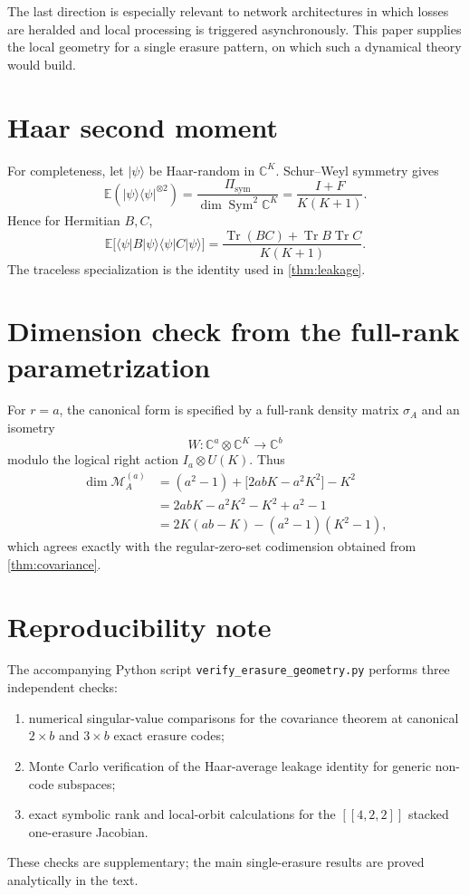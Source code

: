 \documentclass[11pt]{article}
\theoremstyle{definition}
\newcommand{\cM}{\mathcal M}
\newcommand{\Tr}{\operatorname{Tr}}
\newcommand{\C}{\mathbb C}
\newcommand{\1}{\mathbf 1}
\newcommand{\ket}[1]{\lvert #1\rangle}
\newcommand{\bra}[1]{\langle #1\rvert}
\begin{document}
The last direction is especially relevant to network architectures in which losses are heralded and local processing is triggered asynchronously.  This paper supplies the local geometry for a single erasure pattern, on which such a dynamical theory would build.

\appendix

\section{Haar second moment}

For completeness, let $\ket{\psi}$ be Haar-random in $\C^K$.  Schur--Weyl symmetry gives
\[
\mathbb E\left(\ket{\psi}\bra{\psi}^{\otimes2}\right)
=\frac{\Pi_{\mathrm{sym}}}{\dim\operatorname{Sym}^2\C^K}
=\frac{I+F}{K(K+1)}.
\]
Hence for Hermitian $B,C$,
\[
\mathbb E\bigl[\bra{\psi}B\ket{\psi}\bra{\psi}C\ket{\psi}\bigr]
=\frac{\Tr(BC)+\Tr B\Tr C}{K(K+1)}.
\]
The traceless specialization is the identity used in \cref{thm:leakage}.

\section{Dimension check from the full-rank parametrization}

For $r=a$, the canonical form is specified by a full-rank density matrix $\sigma_A$ and an isometry
\[
W:\C^a\otimes\C^K\to\C^b
\]
modulo the logical right action $I_a\otimes U(K)$.  Thus
\begin{align*}
\dim\cM_A^{(a)}
&=(a^2-1)+\bigl[2abK-a^2K^2\bigr]-K^2\\
&=2abK-a^2K^2-K^2+a^2-1\\
&=2K(ab-K)-(a^2-1)(K^2-1),
\end{align*}
which agrees exactly with the regular-zero-set codimension obtained from \cref{thm:covariance}.

\section{Reproducibility note}

The accompanying Python script \texttt{verify\_erasure\_geometry.py} performs three independent checks:
\begin{enumerate}
    \item numerical singular-value comparisons for the covariance theorem at canonical $2\times b$ and $3\times b$ exact erasure codes;
    \item Monte Carlo verification of the Haar-average leakage identity for generic non-code subspaces;
    \item exact symbolic rank and local-orbit calculations for the $[[4,2,2]]$ stacked one-erasure Jacobian.
\end{enumerate}
These checks are supplementary; the main single-erasure results are proved analytically in the text.
\end{document}
